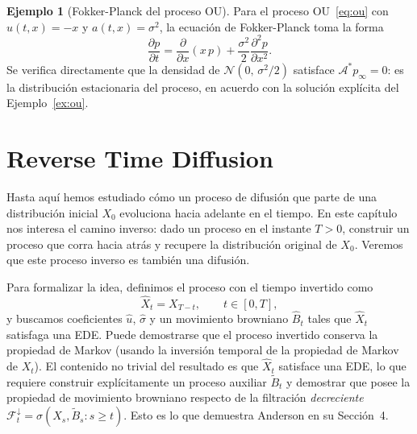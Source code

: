 \documentclass[12pt, a4paper]{report}
\theoremstyle{plain}
\theoremstyle{definition}
\newtheorem{example}{Ejemplo}[chapter]
\theoremstyle{remark}
\begin{document}
\begin{example}[Fokker-Planck del proceso OU]
\label{ex:fp-ou}
Para el proceso OU~\eqref{eq:ou} con $u(t,x) = -x$ y $a(t,x) = \sigma^2$, la ecuación de Fokker-Planck toma la forma
\[
  \frac{\partial p}{\partial t} = \frac{\partial}{\partial x}(x\,p)
  + \frac{\sigma^2}{2}\frac{\partial^2 p}{\partial x^2}.
\]
Se verifica directamente que la densidad de $\mathcal{N}(0,\,\sigma^2/2)$ satisface $\mathcal{A}^*p_\infty = 0$: es la distribución estacionaria del proceso, en acuerdo con la solución explícita del Ejemplo~\ref{ex:ou}.
\end{example}

\chapter{Reverse Time Diffusion}
\label{chap:reverse}

Hasta aquí hemos estudiado cómo un proceso de difusión que parte de una distribución inicial $X_0$ evoluciona hacia adelante en el tiempo. En este capítulo nos interesa el camino inverso: dado un proceso en el instante $T > 0$, construir un proceso que corra hacia atrás y recupere la distribución original de $X_0$. Veremos que este proceso inverso es también una difusión.

Para formalizar la idea, definimos el proceso con el tiempo invertido como
\[
  \hat{X}_t = X_{T-t}, \qquad t \in [0,T],
\]
y buscamos coeficientes $\hat{u}$, $\hat{\sigma}$ y un movimiento browniano $\hat{B}_t$ tales que $\hat{X}_t$ satisfaga una EDE. Puede demostrarse que el proceso invertido conserva la propiedad de Markov (usando la inversión temporal de la propiedad de Markov de $X_t$). El contenido no trivial del resultado es que $\hat{X}_t$ satisface una EDE, lo que requiere construir explícitamente un proceso auxiliar $\tilde{B}_t$ y demostrar que posee la propiedad de movimiento browniano respecto de la filtración \emph{decreciente} $\mathcal{F}^\downarrow_t = \sigma(X_s, \tilde{B}_s : s \geq t)$. Esto es lo que demuestra Anderson \cite{Anderson1982} en su Sección~4.
\end{document}
